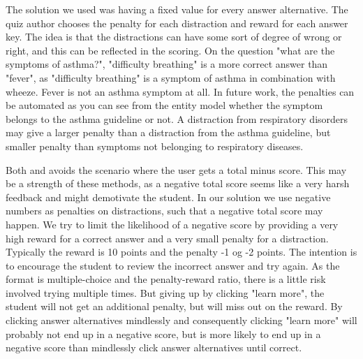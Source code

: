 The solution we used was having a fixed value for every answer alternative. The quiz author chooses the penalty for each distraction and reward for each answer key. The idea is that the distractions can have some sort of degree of wrong or right, and this can be reflected in the scoring. On the question "what are the symptoms of asthma?", "difficulty breathing" is a more correct answer than "fever", as "difficulty breathing" is a symptom of asthma in combination with wheeze. Fever is not an asthma symptom at all. In future work, the penalties can be automated as you can see from the entity model whether the symptom belongs to the asthma guideline or not. A distraction from respiratory disorders may give a larger penalty than a distraction from the asthma guideline, but smaller penalty than symptoms not belonging to respiratory diseases.

Both \textcite{Attali2015} and \textcite{Morrison1995} avoids the scenario where the user gets a total minus score. This may be a strength of these methods, as a negative total score seems like a very harsh feedback and might demotivate the student. In our solution we use negative numbers as penalties on distractions, such that a negative total score may happen. We try to limit the likelihood of a negative score by providing a very high reward for a correct answer and a very small penalty for a distraction. Typically the reward is 10 points and the penalty -1 og -2 points. The intention is to encourage the student to review the incorrect answer and try again. As the format is multiple-choice and the penalty-reward ratio, there is a little risk involved trying multiple times. But giving up by clicking "learn more", the student will not get an additional penalty, but will miss out on the reward. By clicking answer alternatives mindlessly and consequently clicking "learn more" will probably not end up in a negative score, but is more likely to end up in a negative score than mindlessly click answer alternatives until correct.



